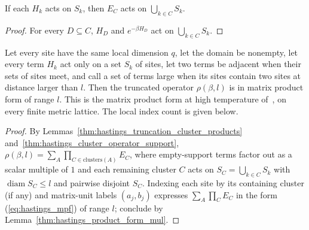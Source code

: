 \begin{lemma}
    \label{thm:hastings_cluster_operator_support}
    \leanok
    If each $H_k$ acts on $S_k$, then $E_C$ acts on $\bigcup_{k\in C}S_k$.
\end{lemma}
\begin{proof}
    \leanok
    For every $D\subseteq C$, $H_D$ and $e^{-\beta H_D}$ act on
    $\bigcup_{k\in C}S_k$.
\end{proof}

\begin{lemma}
    \label{thm:hastings_truncated_product_form}
    \leanok
    Let every site have the same local dimension $q$, let the domain be
    nonempty, let every term $H_k$ act only on a set $S_k$ of
    sites, let two terms be adjacent when their sets of sites meet, and call a
    set of terms large when its sites contain two sites at distance larger
    than $l$. Then the truncated operator $\rho(\beta,l)$ is in matrix product
    form of range $l$. This is the matrix product form at high temperature
    of~\cite[lines 1256--1279]{Hastings2006Solving}, on every finite metric
    lattice. The local index count is given below.
\end{lemma}
\begin{proof}
    \leanok
    By Lemmas~\ref{thm:hastings_truncation_cluster_products}
    and~\ref{thm:hastings_cluster_operator_support},
    $\rho(\beta,l)=\sum_A\prod_{C\in\mathrm{clusters}(A)}E_C$, where empty-support
    terms factor out as a scalar multiple of $1$ and each remaining cluster $C$
    acts on $S_C=\bigcup_{k\in C}S_k$ with $\operatorname{diam}S_C\le l$ and
    pairwise disjoint $S_C$. Indexing each site by its containing cluster (if
    any) and matrix-unit labels $(a_j,b_j)$ expresses $\sum_A\prod_CE_C$ in the
    form (\ref{eq:hastings_mpf}) of range $l$; conclude by
    Lemma~\ref{thm:hastings_product_form_mul}.
\end{proof}

